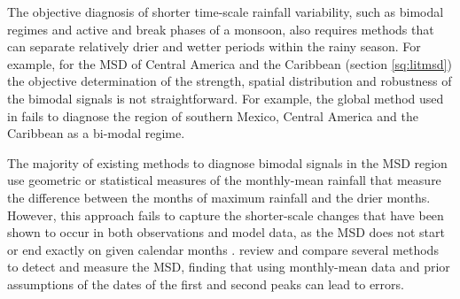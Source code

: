 
The objective diagnosis of shorter time-scale rainfall variability, such as bimodal regimes and active and break phases of a monsoon, also requires methods that can separate relatively drier and wetter periods within the rainy season. For example, for the MSD of Central America and the Caribbean (section \ref{sq:litmsd}) the objective determination of the strength, spatial distribution and robustness of the bimodal signals is not straightforward. For example, the global method used in \cite{bombardi2019} fails to diagnose the region of southern Mexico, Central America and the Caribbean as a bi-modal regime. 

The majority of existing methods to diagnose bimodal signals in the MSD region use geometric or statistical measures of the monthly-mean rainfall that measure the difference between the months of maximum rainfall and the drier months.  
However, this approach fails to capture the shorter-scale changes that have been shown to occur in both observations and model data, as the MSD does not start or end exactly on given calendar months \citep{magana1999,garciafranco2020}.  \cite{zhao2021} review and compare several methods to detect and measure the MSD, finding that using monthly-mean data and prior assumptions of the dates of the first and second peaks can lead to errors.  %



